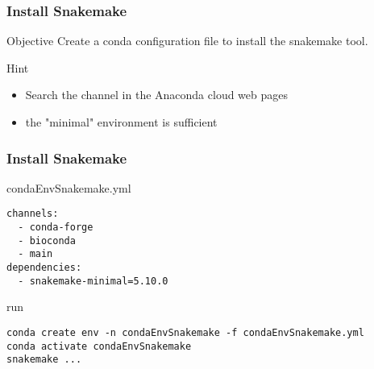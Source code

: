 \begin{frame}[containsverbatim]
\frametitle{Install Snakemake}
\begin{exampleblock}{Objective}
Create a conda configuration file to install the snakemake tool.
\end{exampleblock}
\begin{exampleblock}{Hint}
\begin{itemize}
    \item Search the channel in the Anaconda cloud web pages
    \item the "minimal" environment is sufficient
\end{itemize}
\end{exampleblock}
\end{frame}
\begin{frame}[containsverbatim]
\frametitle{Install Snakemake}
\begin{exampleblock}{condaEnvSnakemake.yml}
\begin{lstlisting}
channels:
  - conda-forge
  - bioconda
  - main
dependencies:
  - snakemake-minimal=5.10.0
\end{lstlisting}
\end{exampleblock}
\begin{exampleblock}{run}
\begin{lstlisting}
conda create env -n condaEnvSnakemake -f condaEnvSnakemake.yml
conda activate condaEnvSnakemake
snakemake ...
\end{lstlisting}
\end{exampleblock}
\end{frame}